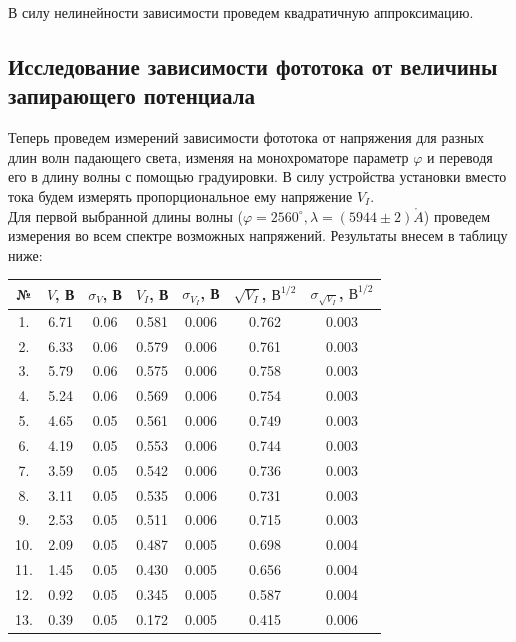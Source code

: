\documentclass[a4paper,12pt]{extarticle}
\begin{document}
В силу нелинейности зависимости проведем квадратичную аппроксимацию.
\subsection*{Исследование зависимости фототока от величины запирающего потенциала}
Теперь проведем измерений зависимости фототока от напряжения для разных длин волн падающего света, изменяя на монохроматоре параметр $\varphi$ и переводя его в длину волны с помощью градуировки. В силу устройства установки вместо тока будем измерять пропорциональное ему напряжение $V_{I}$.\\
Для первой выбранной длины волны ($ \varphi = 2560^\circ, \lambda = (5944 \pm 2) \mathring{A}$) проведем измерения во всем спектре возможных напряжений. Результаты внесем в таблицу ниже:
\begin{table}[H]
    \begin{center}
        \begin{tabular}{|c|c|c|c|c|c|c|}
            \hline
            № & $V$, В & $\sigma_V$, В & $V_I$, В & $\sigma_{V_I}$, В & $ \sqrt{V_I}$, $\text{В}^{1/2}$ & $\sigma_{\sqrt{V_I}}$, $\text{В}^{1/2}$ \\
            \hline
            1.  & 6.71  & 0.06  & 0.581 & 0.006 & 0.762 & 0.003 \\
            2.  & 6.33  & 0.06  & 0.579 & 0.006 & 0.761 & 0.003 \\
            3.  & 5.79  & 0.06  & 0.575 & 0.006 & 0.758 & 0.003 \\
            4.  & 5.24  & 0.06  & 0.569 & 0.006 & 0.754 & 0.003 \\
            5.  & 4.65  & 0.05  & 0.561 & 0.006 & 0.749 & 0.003 \\
            6.  & 4.19  & 0.05  & 0.553 & 0.006 & 0.744 & 0.003 \\
            7.  & 3.59  & 0.05  & 0.542 & 0.006 & 0.736 & 0.003 \\
            8.  & 3.11  & 0.05  & 0.535 & 0.006 & 0.731 & 0.003 \\
            9.  & 2.53  & 0.05  & 0.511 & 0.006 & 0.715 & 0.003 \\
            10. & 2.09  & 0.05  & 0.487 & 0.005 & 0.698 & 0.004 \\
            11. & 1.45  & 0.05  & 0.430 & 0.005 & 0.656 & 0.004 \\
            12. & 0.92  & 0.05  & 0.345 & 0.005 & 0.587 & 0.004 \\
            13. & 0.39  & 0.05  & 0.172 & 0.005 & 0.415 & 0.006 \\

\end{tabular}
\end{center}
\end{table}
\end{document}
